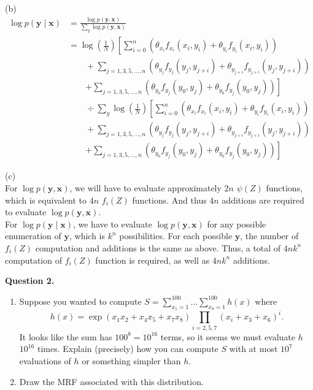 \documentclass[11pt]{article}
\renewcommand{\vec}[1]{\mathbf{#1}}
\begin{document}
\newpage %
\begin{answertext}{20cm}{}

(b)
\begin{align*}
\log p(\vec{y}\mid\vec{x}) &= \frac{\log p(\vec{y}, \vec{x})}{\sum_{y} \log p(\vec{y}, \vec{x})} \\
& = \log \left( \frac{1}{N} \right) \left[ \sum_{i=0}^{n} \left( \theta_{x_{i}}f_{x_{i}}(x_{i}, y_{i}) + \theta_{y_{i}}f_{y_{i}}(x_{i}, y_{i}) \right) \right. \\
	&\qquad + \sum_{j = 1,3,5,\ldots,n} \left( \theta_{y_{j}}f_{y_{j}}(y_{j}, y_{j+i}) + \theta_{y_{j+i}}f_{y_{j+i}}(y_{j}, y_{j+i}) \right) \\
	&\qquad \left. + \sum_{j = 1,3,5,\ldots,n} \left( \theta_{y_{0}}f_{y_{j}}(y_{0}, y_{j}) + \theta_{y_{0}}f_{y_{j}}(y_{0}, y_{j}) \right) \right] \\
	&\qquad \div \sum_{y} \log \left( \frac{1}{N} \right) \left[ \sum_{i=0}^{n} \left( \theta_{x_{i}}f_{x_{i}}(x_{i}, y_{i}) + \theta_{y_{i}}f_{y_{i}}(x_{i}, y_{i}) \right) \right. \\
	&\qquad + \sum_{j = 1,3,5,\ldots,n} \left( \theta_{y_{j}}f_{y_{j}}(y_{j}, y_{j+i}) + \theta_{y_{j+i}}f_{y_{j+i}}(y_{j}, y_{j+i}) \right) \\
	&\qquad \left. + \sum_{j = 1,3,5,\ldots,n} \left( \theta_{y_{0}}f_{y_{j}}(y_{0}, y_{j}) + \theta_{y_{0}}f_{y_{j}}(y_{0}, y_{j}) \right) \right]
\end{align*}

(c) \\
For $\log p(\vec{y}, \vec{x})$, we will have to evaluate approximately $2n$ $\psi(Z)$ functions, which is equivalent to $4n$ $f_{i}(Z)$ functions. And thus $4n$ additions are required to evaluate $\log p(\vec{y}, \vec{x})$. \\
For $\log p(\vec{y}\mid\vec{x})$, we have to evaluate $\log p(\vec{y}, \vec{x})$ for any possible enumeration of $\vec{y}$, which is $k^{n}$ possibilities. For each possible $\vec{y}$, the number of $f_{i}(Z)$ computation and additions is the same as above. Thus, a total of $4nk^{n}$ computation of $f_{i}(Z)$ function is required, as well as $4nk^{n}$ additions. \\

\end{answertext} 

{\bf Question 2.}

\begin{enumerate}
\item[(a)] Suppose you wanted to compute $S = \sum^{100}_{x_1 = 1} \dots \sum^{100}_{x_8 = 1} h(x)$ where
\begin{equation*}
    h(x) = \exp(x_1 x_2 + x_4 x_5 + x_7 x_8) \prod_{i=2,5,7} (x_i + x_3 + x_6)^i.
\end{equation*}
It looks like the sum has $100^8 = 10^{16}$ terms, so it seems we must evaluate $h$ $10^{16}$ times. Explain (precisely) how you can compute $S$ with at most $10^7$ evaluations of $h$ or something simpler than $h$.

\item[(b)] Draw the MRF associated with this distribution.
\end{enumerate}
\end{document}

